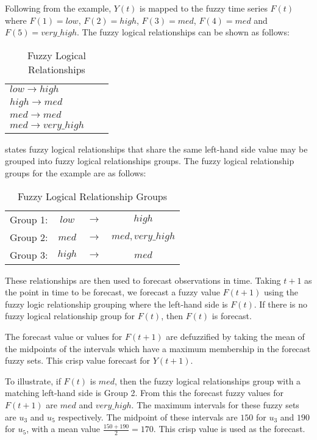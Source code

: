 \documentclass{article}
\theoremstyle{definition}
\begin{document}
Following from the example, $Y(t)$ is mapped to the fuzzy time series $F(t)$ where $F(1)=low$, $F(2)=high$, $F(3)=med$, $F(4)=med$ and $F(5)=very\_high$. The fuzzy logical relationships can be shown as follows: 

\begin{table}[h]
	\center
	\begin{tabular}{ l l l }
  	$low \rightarrow high$  \\
  	$high \rightarrow med$ \\
  	$med \rightarrow med$ \\
  	$med \rightarrow very\_high$ \\
	\end{tabular}
	\caption{Fuzzy Logical Relationships}
\end{table}

 states fuzzy logical relationships that share the same left-hand side value may be grouped into fuzzy logical relationships groups. The fuzzy logical relationship groups for the example are as follows:

\begin{table}[h]
	\center
	\begin{tabular}{ c c c c }
  	Group 1: & $low$ & $\rightarrow$ & $high$ \\
  	Group 2: & $med$ & $\rightarrow$ & $med, very\_high$ \\
  	Group 3: & $high$ & $\rightarrow$ & $med$ \\
	\end{tabular}
	\caption{Fuzzy Logical Relationship Groups}
\end{table}

These relationships are then used to forecast observations in time. Taking $t+1$ as the point in time to be forecast, we forecast a fuzzy value $F(t+1)$ using the fuzzy logic relationship grouping where the left-hand side is $F(t)$. If there is no fuzzy logical relationship group for $F(t)$, then $F(t)$ is forecast.

The forecast value or values for $F(t+1)$ are defuzzified by taking the mean of the midpoints of the intervals which have a maximum membership in the forecast fuzzy sets. This crisp value forecast for $Y(t+1)$.

To illustrate, if $F(t)$ is $med$, then the fuzzy logical relationships group with a matching left-hand side is Group 2. From this the forecast fuzzy values for $F(t+1)$ are $med$ and $very\_high$. The maximum intervals for these fuzzy sets are $u_3$ and $u_5$ respectively. The midpoint of these intervals are $150$ for $u_3$ and $190$ for $u_5$, with a mean value $\frac{150 + 190}{2}=170$. This crisp value is used as the forecast.
\end{document}
